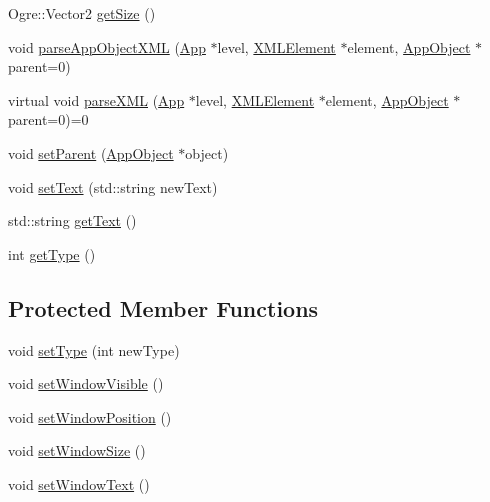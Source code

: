 \begin{DoxyCompactItemize}
\item 
Ogre\-::\-Vector2 \hyperlink{class_rad_xml_1_1_app_object_a2c90b1b67a7cc923dd4424d8e6f12440}{get\-Size} ()
\item 
void \hyperlink{class_rad_xml_1_1_app_object_a40e74ca00d3dc3238c215b9e57d7c784}{parse\-App\-Object\-X\-M\-L} (\hyperlink{class_rad_xml_1_1_app}{App} $\ast$level, \hyperlink{class_x_m_l_element}{X\-M\-L\-Element} $\ast$element, \hyperlink{class_rad_xml_1_1_app_object}{App\-Object} $\ast$parent=0)
\item 
virtual void \hyperlink{class_rad_xml_1_1_app_object_a677e0af301973343665699f6d07f2018}{parse\-X\-M\-L} (\hyperlink{class_rad_xml_1_1_app}{App} $\ast$level, \hyperlink{class_x_m_l_element}{X\-M\-L\-Element} $\ast$element, \hyperlink{class_rad_xml_1_1_app_object}{App\-Object} $\ast$parent=0)=0
\item 
void \hyperlink{class_rad_xml_1_1_app_object_a5d06f77234f9ab7e5aab455543ec3657}{set\-Parent} (\hyperlink{class_rad_xml_1_1_app_object}{App\-Object} $\ast$object)
\item 
void \hyperlink{class_rad_xml_1_1_app_object_a63e082957df20145995ee2422504e36f}{set\-Text} (std\-::string new\-Text)
\item 
std\-::string \hyperlink{class_rad_xml_1_1_app_object_a392921d4c78431bdb56231d00a5feb8d}{get\-Text} ()
\item 
int \hyperlink{class_rad_xml_1_1_app_object_ab6639f8bd0c60700c4880b10e4b7d85a}{get\-Type} ()
\end{DoxyCompactItemize}
\subsection*{Protected Member Functions}
\begin{DoxyCompactItemize}
\item 
void \hyperlink{class_rad_xml_1_1_app_object_a79d028d30e542d2920a96e1423eb5790}{set\-Type} (int new\-Type)
\item 
void \hyperlink{class_rad_xml_1_1_app_object_a4edd11eb5b11611e4a3fb7f1c46b676d}{set\-Window\-Visible} ()
\item 
void \hyperlink{class_rad_xml_1_1_app_object_a26a87c2884c0a299e605e0914dfa6612}{set\-Window\-Position} ()
\item 
void \hyperlink{class_rad_xml_1_1_app_object_ab1f44bcc9ea85fc472c1108c340b51a5}{set\-Window\-Size} ()
\item 
void \hyperlink{class_rad_xml_1_1_app_object_ab90961a4ad68921d4211369a8645cee4}{set\-Window\-Text} ()
\end{DoxyCompactItemize}
